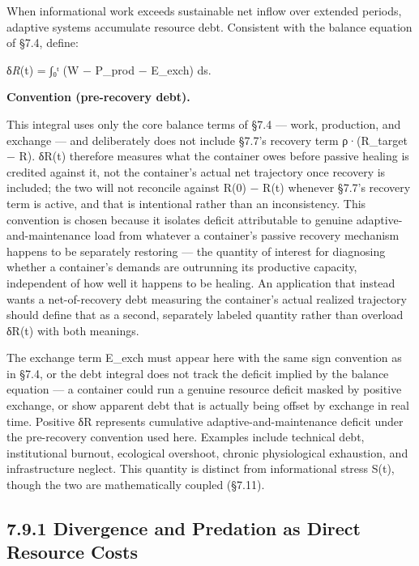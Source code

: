 \documentclass[
]{article}
\begin{document}
When informational work exceeds sustainable net inflow over extended
periods, adaptive systems accumulate resource debt. Consistent with the
balance equation of §7.4, define:

δ\emph{R}(t) = ∫₀ᵗ (W − P\_prod − E\_exch) ds.

\textbf{Convention (pre-recovery debt).}

This integral uses only the core balance terms of §7.4 --- work,
production, and exchange --- and deliberately does not include §7.7's
recovery term ρ·(R\_target − R). δR(t) therefore measures what the
container owes before passive healing is credited against it, not the
container's actual net trajectory once recovery is included; the two
will not reconcile against R(0) − R(t) whenever §7.7's recovery term is
active, and that is intentional rather than an inconsistency. This
convention is chosen because it isolates deficit attributable to genuine
adaptive-and-maintenance load from whatever a container's passive
recovery mechanism happens to be separately restoring --- the quantity
of interest for diagnosing whether a container's demands are outrunning
its productive capacity, independent of how well it happens to be
healing. An application that instead wants a net-of-recovery debt
measuring the container's actual realized trajectory should define that
as a second, separately labeled quantity rather than overload δR(t) with
both meanings.

The exchange term E\_exch must appear here with the same sign convention
as in §7.4, or the debt integral does not track the deficit implied by
the balance equation --- a container could run a genuine resource
deficit masked by positive exchange, or show apparent debt that is
actually being offset by exchange in real time. Positive δR represents
cumulative adaptive-and-maintenance deficit under the pre-recovery
convention used here. Examples include technical debt, institutional
burnout, ecological overshoot, chronic physiological exhaustion, and
infrastructure neglect. This quantity is distinct from informational
stress S(t), though the two are mathematically coupled (§7.11).

\hypertarget{divergence-and-predation-as-direct-resource-costs}{%
\subsection{7.9.1 Divergence and Predation as Direct Resource
Costs}\label{divergence-and-predation-as-direct-resource-costs}}
\end{document}
